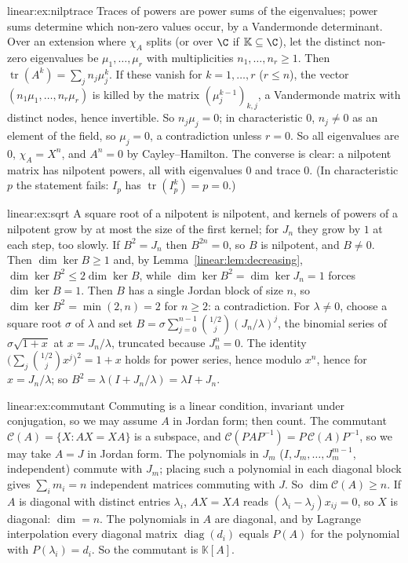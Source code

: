 \begin{solution}{linear:ex:nilptrace}
\idea Traces of powers are power sums of the eigenvalues; power sums determine which non-zero values occur, by a
Vandermonde determinant.
\writeup Over an extension where $\chi_A$ splits (or over $\C$ if $\mathbb K\subseteq\C$), let the distinct non-zero eigenvalues
be $\mu_1,\dots,\mu_r$ with multiplicities $n_1,\dots,n_r\ge1$. Then $\operatorname{tr}(A^k)=\sum_jn_j\mu_j^k$. If these vanish for
$k=1,\dots,r$ ($r\le n$), the vector $(n_1\mu_1,\dots,n_r\mu_r)$ is killed by the matrix $(\mu_j^{k-1})_{k,j}$, a Vandermonde matrix
with distinct nodes, hence invertible. So $n_j\mu_j=0$; in characteristic $0$, $n_j\ne0$ as an element of the field, so
$\mu_j=0$, a contradiction unless $r=0$. So all eigenvalues are $0$, $\chi_A=X^n$, and $A^n=0$ by Cayley--Hamilton. The
converse is clear: a nilpotent matrix has nilpotent powers, all with eigenvalues $0$ and trace $0$. (In characteristic
$p$ the statement fails: $I_p$ has $\operatorname{tr}(I_p^k)=p=0$.)
\end{solution}

\begin{solution}{linear:ex:sqrt}
\idea A square root of a nilpotent is nilpotent, and kernels of powers of a nilpotent grow by at most the size of the
first kernel; for $J_n$ they grow by $1$ at each step, too slowly.
\writeup If $B^2=J_n$ then $B^{2n}=0$, so $B$ is nilpotent, and $B\ne0$. Then $\dim\ker B\ge1$ and, by
Lemma~\ref{linear:lem:decreasing}, $\dim\ker B^2\le2\dim\ker B$, while $\dim\ker B^2=\dim\ker J_n=1$ forces $\dim\ker B=1$. Then
$B$ has a single Jordan block of size $n$, so $\dim\ker B^2=\min(2,n)=2$ for $n\ge2$: a contradiction. For $\lambda\ne0$,
choose a square root $\sigma$ of $\lambda$ and set $B=\sigma\sum_{j=0}^{n-1}\binom{1/2}{j}(J_n/\lambda)^j$, the binomial series of
$\sigma\sqrt{1+x}$ at $x=J_n/\lambda$, truncated because $J_n^n=0$. The identity $\bigl(\sum_j\binom{1/2}jx^j\bigr)^2=1+x$ holds for
power series, hence modulo $x^n$, hence for $x=J_n/\lambda$; so $B^2=\lambda(I+J_n/\lambda)=\lambda I+J_n$.
\end{solution}

\begin{solution}{linear:ex:commutant}
\idea Commuting is a linear condition, invariant under conjugation, so we may assume $A$ in Jordan form; then count.
\writeup The commutant $\mathcal C(A)=\{X:AX=XA\}$ is a subspace, and $\mathcal C(PAP^{-1})=P\,\mathcal C(A)P^{-1}$, so we may take $A=J$
in Jordan form. The polynomials in $J_m$ ($I,J_m,\dots,J_m^{m-1}$, independent) commute with $J_m$; placing such a polynomial
in each diagonal block gives $\sum_im_i=n$ independent matrices commuting with $J$. So $\dim\mathcal C(A)\ge n$. If $A$ is
diagonal with distinct entries $\lambda_i$, $AX=XA$ reads $(\lambda_i-\lambda_j)x_{ij}=0$, so $X$ is diagonal: $\dim=n$. The
polynomials in $A$ are diagonal, and by Lagrange interpolation every diagonal matrix $\operatorname{diag}(d_i)$ equals
$P(A)$ for the polynomial with $P(\lambda_i)=d_i$. So the commutant is $\mathbb K[A]$.
\end{solution}

